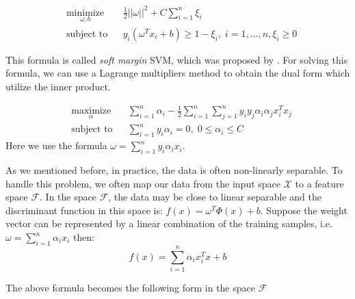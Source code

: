  \begin{equation}\label{eq: svm_optimization_margin}
 \begin{aligned}
 & \underset{\omega, b}{\text{minimize}}
 & &\frac{1}{2}||\omega||^2+C\sum_{i=1}^{n}\xi_i\\
 & \text{subject to}
 & & y_i(\omega^Tx_i+b)\geq 1-\xi_i,  \; i = 1,  \ldots,  n, \xi_i\geq 0
 \end{aligned}
 \end{equation}
 
This formula is called \textit{soft margin} SVM,  which was proposed by \cite{cortes1995support}. For solving this formula,  we can use a Lagrange multipliers method to obtain the dual form which utilize the inner product.

\begin{equation}
\begin{aligned}
& \underset{\alpha}{\text{maximize}}
& &\sum_{i=1}^{n}\alpha_i -\frac{1}{2}\sum_{i=1}^{n}\sum_{j=1}^{n}y_iy_j\alpha_i\alpha_jx_i^Tx_j\\
& \text{subject to}
& & \sum_{i=1}^{n}y_i\alpha_i=0, \; 0\leq\alpha_i\leq C
\end{aligned}
\end{equation}   
Here we use the formula $\omega=\sum_{i=1}^{n}y_i\alpha_ix_i$. 

As we mentioned before,  in practice,  the data is often non-linearly separable. To handle this problem,  we often map our data from the input space $\mathcal{X}$ to a feature space $\mathcal{F}$. In the space $\mathcal{F}$,  the data may be close to linear separable and the discriminant function in this space is: $f(x)=\omega^T\Phi(x)+b$. Suppose the weight vector can be represented by a linear combination of the training samples, i.e. $\omega=\sum_{i=1}^{n}\alpha_ix_i$
then: 
\begin{equation}
f(x)=\sum_{i=1}^{n}\alpha_ix_i^Tx +b
\end{equation}

The above formula becomes the following form in the space $\mathcal{F}$

